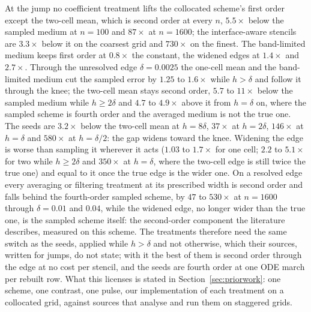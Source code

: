 \documentclass[11pt]{amsart}
\theoremstyle{definition}
\theoremstyle{remark}
\newcommand{\sci}[2]{\ensuremath{#1 \times 10^{#2}}}
\newcommand{\tablesetup}{\footnotesize\setlength{\tabcolsep}{2.5pt}%
  \renewcommand{\sci}[2]{\ensuremath{##1{\times}10^{##2}}}}
\begin{document}
At the jump no coefficient treatment lifts the collocated scheme's first
order except the two-cell mean, which is second order at every $n$,
$5.5\times$ below the sampled medium at $n = 100$ and $87\times$ at
$n = 1600$; the interface-aware stencils are $3.3\times$ below it on the
coarsest grid and $730\times$ on the finest. The band-limited medium
keeps first order at $0.8\times$ the constant, the widened edges at
$1.4\times$ and $2.7\times$. Through the unresolved edge
$\delta = 0.0025$ the one-cell mean and the band-limited medium cut the
sampled error by $1.25$ to $1.6\times$ while $h > \delta$ and follow it
through the knee; the two-cell mean stays second order, $5.7$ to
$11\times$ below the sampled medium while $h \ge 2\delta$ and $4.7$ to
$4.9\times$ above it from $h = \delta$ on, where the sampled scheme is
fourth order and the averaged medium is not the true one. The seeds are
$3.2\times$ below the two-cell mean at $h = 8\delta$, $37\times$ at
$h = 2\delta$, $146\times$ at $h = \delta$ and $580\times$ at
$h = \delta / 2$: the gap widens toward the knee. Widening the edge is
worse than sampling it wherever it acts ($1.03$ to $1.7\times$ for one
cell; $2.2$ to $5.1\times$ for two while $h \ge 2\delta$ and $350\times$
at $h = \delta$, where the two-cell edge is still twice the true one) and
equal to it once the true edge is the wider one. On a resolved edge every averaging or filtering treatment at its
prescribed width is second order and falls behind the fourth-order
sampled scheme, by $47$ to $530\times$ at $n = 1600$ through
$\delta = 0.01$ and $0.04$, while the widened edge, no longer wider than
the true one, is the sampled scheme itself: the
second-order component the literature describes, measured on this
scheme. The treatments therefore need the same switch as the seeds,
applied while $h > \delta$ and not otherwise, which their sources, written
for jumps, do not state; with it the best of them is second order through
the edge at no cost per stencil, and the seeds are fourth order at one
ODE march per rebuilt row. What this licenses is stated in
Section~\ref{sec:priorwork}: one scheme, one contrast, one pulse, our
implementation of each treatment on a collocated grid, against sources
that analyse and run them on staggered grids.

\begin{table}
  \caption{The standard scheme on a treated medium (the standing
  alternative) against the standard scheme on the sampled medium and the
  seeds: relative $\ell^2$ error in $f$ at $t = 1$ against the true
  medium's reference, and the rates between successive grids. The cell
  means and the band-limited medium are applied at their prescribed width
  at every $n$; the widened edges of the text are omitted, they never
  beat the sampled medium.}
  \label{tab:comparators1d}
  \centering
  \tablesetup
  \resizebox{\textwidth}{!}{}
\end{table}
\end{document}
